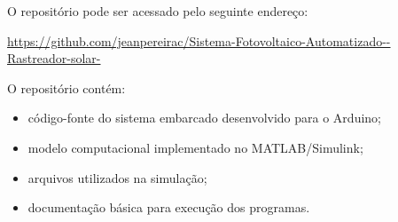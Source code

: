 \begin{apendicesenv}
O repositório pode ser acessado pelo seguinte endereço:

\url{https://github.com/jeanpereirac/Sistema-Fotovoltaico-Automatizado--Rastreador-solar-}

O repositório contém:

\begin{itemize}
    \item código-fonte do sistema embarcado desenvolvido para o Arduino;
    \item modelo computacional implementado no MATLAB/Simulink;
    \item arquivos utilizados na simulação;
    \item documentação básica para execução dos programas.
\end{itemize}

\end{apendicesenv}
